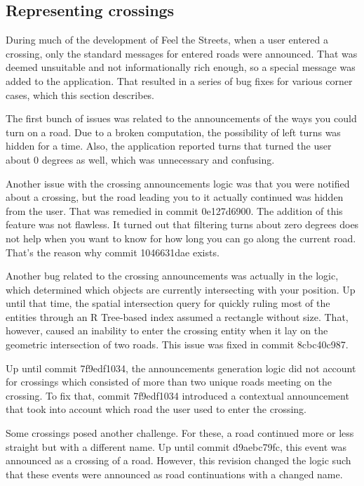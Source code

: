 \documentclass[nolof,digital]{fithesis3}
\begin{document}
\subsection{Representing crossings} \label{ref:crossings}
During much of the development of Feel the Streets, when a user entered a crossing, only the standard messages for entered roads were announced. That was deemed unsuitable and not informationally rich enough, so a special message was added to the application. That resulted in a series of bug fixes for various corner cases, which this section describes.

The first bunch of issues was related to the announcements of the ways you could turn on a road. Due to a broken computation, the possibility of left turns was hidden for a time. Also, the application reported turns that turned the user about 0 degrees as well, which was unnecessary and confusing.

Another issue with the crossing announcements logic was that you were notified about a crossing, but the road leading you to it actually continued was hidden from the user. That was remedied in commit 0e127d6900. The addition of this feature was not flawless. It turned out that filtering turns about zero degrees does not help when you want to know for how long you can go along the current road. That's the reason why commit 1046631dae exists.

Another bug related to the crossing announcements was actually in the logic, which determined which objects are currently intersecting with your position. Up until that time, the spatial intersection query for quickly ruling most of the entities through an R Tree-based index assumed a rectangle without size. That, however, caused an inability to enter the crossing entity when it lay on the geometric intersection of two roads. This issue was fixed in commit 8cbc40c987.

Up until commit 7f9edf1034, the announcements generation logic did not account for crossings which consisted of more than two unique roads meeting on the crossing. To fix that, commit 7f9edf1034 introduced a contextual announcement that took into account which road the user used to enter the crossing.

Some crossings posed another challenge. For these, a road continued more or less straight but with a different name. Up until commit d9aebc79fc, this event was announced as a crossing of a road. However, this revision changed the logic such that these events were announced as road continuations with a changed name.
\end{document}
